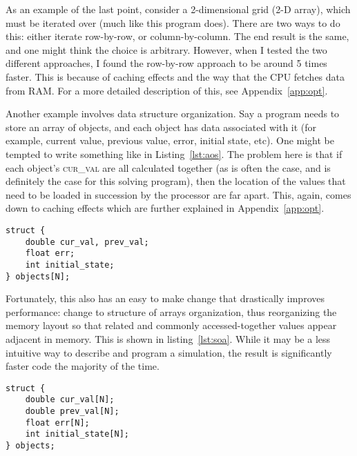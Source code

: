 As an example of the last point, consider a 2-dimensional grid (2-D array), which must be iterated over (much like
this program does). There are two ways to do this: either iterate row-by-row, or column-by-column. The end result is
the same, and one might think the choice is arbitrary. However, when I tested the two different approaches, I found
the row-by-row approach to be around 5 times faster. This is because of caching effects and the way that the CPU
fetches data from RAM. For a more detailed description of this, see Appendix~\ref{app:opt}.

Another example involves data structure organization. Say a program needs to store an array of objects, and each object
has data associated with it (for example, current value, previous value, error, initial state, etc). One might be tempted
to write something like in Listing~\ref{lst:aos}. The problem here is that if each object's \textsc{cur\_val} are all
calculated together (as is often the case, and is definitely the case for this solving program), then the location of
the values that need to be loaded in succession by the processor are far apart. This, again, comes down to caching
effects which are further explained in Appendix~\ref{app:opt}.

\begin{minipage}{\linewidth}
\begin{lstlisting}[frame=single,label=lst:aos,caption={Array of structures organization.}]
struct {
	double cur_val, prev_val;
	float err;
	int initial_state;
} objects[N];
\end{lstlisting}
\end{minipage}

Fortunately, this also has an easy to make change that drastically improves performance: change to structure of
arrays organization, thus reorganizing the memory layout so that related and commonly accessed-together values
appear adjacent in memory. This is shown in listing~\ref{lst:soa}. While it may be a less intuitive way to describe
and program a simulation, the result is significantly faster code the majority of the time.

\begin{minipage}{\linewidth}
\begin{lstlisting}[frame=single,label=lst:soa,caption={Structure of arrays organization.}]
struct {
	double cur_val[N];
	double prev_val[N];
	float err[N];
	int initial_state[N];
} objects;
\end{lstlisting}
\end{minipage}

